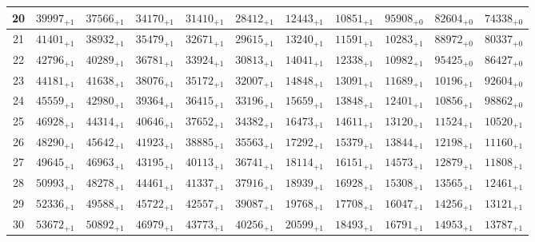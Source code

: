 \documentclass[10pt, a4paper]{article}
\begin{document}
\begin{center}
\begin{tabular}{c || c c c c c | c c c c c}
        20 & \({39997}_{+1}\) & \({37566}_{+1}\) & \({34170}_{+1}\) & \({31410}_{+1}\) & \({28412}_{+1}\) & \({12443}_{+1}\) & \({10851}_{+1}\) & \({95908}_{+0}\) & \({82604}_{+0}\) & \({74338}_{+0}\)\\
        \hline
        21 & \({41401}_{+1}\) & \({38932}_{+1}\) & \({35479}_{+1}\) & \({32671}_{+1}\) & \({29615}_{+1}\) & \({13240}_{+1}\) & \({11591}_{+1}\) & \({10283}_{+1}\) & \({88972}_{+0}\) & \({80337}_{+0}\)\\
        22 & \({42796}_{+1}\) & \({40289}_{+1}\) & \({36781}_{+1}\) & \({33924}_{+1}\) & \({30813}_{+1}\) & \({14041}_{+1}\) & \({12338}_{+1}\) & \({10982}_{+1}\) & \({95425}_{+0}\) & \({86427}_{+0}\)\\
        23 & \({44181}_{+1}\) & \({41638}_{+1}\) & \({38076}_{+1}\) & \({35172}_{+1}\) & \({32007}_{+1}\) & \({14848}_{+1}\) & \({13091}_{+1}\) & \({11689}_{+1}\) & \({10196}_{+1}\) & \({92604}_{+0}\)\\
        24 & \({45559}_{+1}\) & \({42980}_{+1}\) & \({39364}_{+1}\) & \({36415}_{+1}\) & \({33196}_{+1}\) & \({15659}_{+1}\) & \({13848}_{+1}\) & \({12401}_{+1}\) & \({10856}_{+1}\) & \({98862}_{+0}\)\\
        25 & \({46928}_{+1}\) & \({44314}_{+1}\) & \({40646}_{+1}\) & \({37652}_{+1}\) & \({34382}_{+1}\) & \({16473}_{+1}\) & \({14611}_{+1}\) & \({13120}_{+1}\) & \({11524}_{+1}\) & \({10520}_{+1}\)\\
        \hline
        26 & \({48290}_{+1}\) & \({45642}_{+1}\) & \({41923}_{+1}\) & \({38885}_{+1}\) & \({35563}_{+1}\) & \({17292}_{+1}\) & \({15379}_{+1}\) & \({13844}_{+1}\) & \({12198}_{+1}\) & \({11160}_{+1}\)\\
        27 & \({49645}_{+1}\) & \({46963}_{+1}\) & \({43195}_{+1}\) & \({40113}_{+1}\) & \({36741}_{+1}\) & \({18114}_{+1}\) & \({16151}_{+1}\) & \({14573}_{+1}\) & \({12879}_{+1}\) & \({11808}_{+1}\)\\
        28 & \({50993}_{+1}\) & \({48278}_{+1}\) & \({44461}_{+1}\) & \({41337}_{+1}\) & \({37916}_{+1}\) & \({18939}_{+1}\) & \({16928}_{+1}\) & \({15308}_{+1}\) & \({13565}_{+1}\) & \({12461}_{+1}\)\\
        29 & \({52336}_{+1}\) & \({49588}_{+1}\) & \({45722}_{+1}\) & \({42557}_{+1}\) & \({39087}_{+1}\) & \({19768}_{+1}\) & \({17708}_{+1}\) & \({16047}_{+1}\) & \({14256}_{+1}\) & \({13121}_{+1}\)\\
        30 & \({53672}_{+1}\) & \({50892}_{+1}\) & \({46979}_{+1}\) & \({43773}_{+1}\) & \({40256}_{+1}\) & \({20599}_{+1}\) & \({18493}_{+1}\) & \({16791}_{+1}\) & \({14953}_{+1}\) & \({13787}_{+1}\)\\

\end{tabular}
\end{center}
\end{document}
